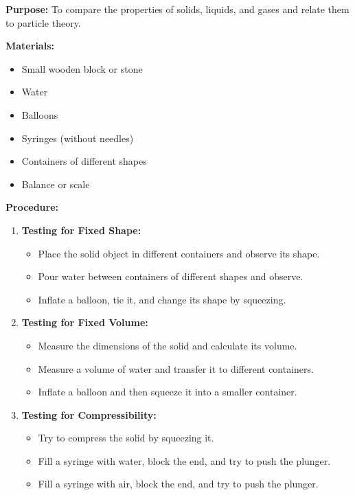 \documentclass[justified,notoc]{tufte-book}
\newenvironment{investigation}[1]{%
    \begin{tcolorbox}[colback=info!10,colframe=info,title=\textbf{Investigation: #1}]
}{%
    \end{tcolorbox}
}
\begin{document}
\begin{investigation}{Comparing Properties of States of Matter}
\textbf{Purpose:} To compare the properties of solids, liquids, and gases and relate them to particle theory.

\textbf{Materials:}
\begin{itemize}
    \item Small wooden block or stone
    \item Water
    \item Balloons
    \item Syringes (without needles)
    \item Containers of different shapes
    \item Balance or scale
\end{itemize}

\textbf{Procedure:}
\begin{enumerate}
    \item \textbf{Testing for Fixed Shape:}
    \begin{itemize}
        \item Place the solid object in different containers and observe its shape.
        \item Pour water between containers of different shapes and observe.
        \item Inflate a balloon, tie it, and change its shape by squeezing.
    \end{itemize}
    
    \item \textbf{Testing for Fixed Volume:}
    \begin{itemize}
        \item Measure the dimensions of the solid and calculate its volume.
        \item Measure a volume of water and transfer it to different containers.
        \item Inflate a balloon and then squeeze it into a smaller container.
    \end{itemize}
    
    \item \textbf{Testing for Compressibility:}
    \begin{itemize}
        \item Try to compress the solid by squeezing it.
        \item Fill a syringe with water, block the end, and try to push the plunger.
        \item Fill a syringe with air, block the end, and try to push the plunger.
    \end{itemize}
    

\end{enumerate}
\end{investigation}
\end{document}
